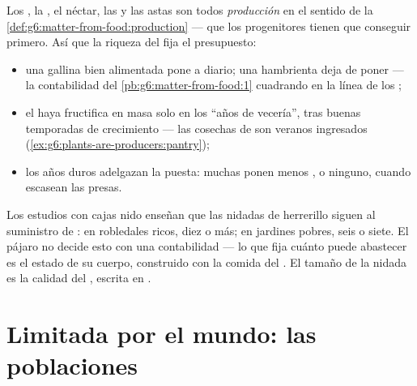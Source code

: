 \begin{proposition}\label{prop:g8:reproduction-and-environment:cost}
Los , la , el néctar, las  y las astas son todos
\emph{producción} en el sentido de la
\cref{def:g6:matter-from-food:production} ---  que los
progenitores tienen que conseguir primero. Así que la riqueza del
 fija el presupuesto:
\begin{itemize}
  \item una gallina bien alimentada pone a diario; una hambrienta deja
        de poner --- la contabilidad del
        \cref{pb:g6:matter-from-food:1} cuadrando en la línea de los
        ;
  \item el haya fructifica en masa solo en los ``años de vecería'', tras
        buenas temporadas de crecimiento --- las cosechas de  son
        veranos ingresados
        (\cref{ex:g6:plants-are-producers:pantry});
  \item los años duros adelgazan la puesta: muchas  ponen menos
        , o ninguno, cuando escasean las presas.
\end{itemize}
\end{proposition}
\admitted

\begin{example}\label{ex:g8:reproduction-and-environment:clutch}
Los estudios con cajas nido enseñan que las nidadas de herrerillo
siguen al suministro de : en robledales ricos, diez  o
más; en jardines pobres, seis o siete. El pájaro no decide esto con una
contabilidad --- lo que fija cuánto puede abastecer es el estado de su
cuerpo, construido con la comida del . El tamaño de la nidada es
la calidad del , escrita en .
\end{example}

\section{Limitada por el mundo: las poblaciones}

